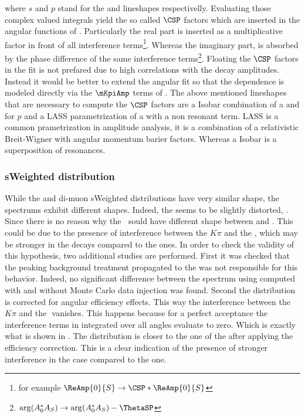 \noindent where $s$ and $p$ stand for the \swave and \pwave lineshapes respectivelly. Evaluating those complex valued integrals yield 
the so called $\CSP$ factors which are inserted in the angular functions of . Particularly the real part is inserted
as a multiplicative factor in front of all \spwave interference
terms\footnote{for example $\ReAmp{0}{S} \rightarrow \CSP * \ReAmp{0}{S} $}.
Whereas the imaginary part, is absorbed by the phase difference of the same interference 
terms\footnote{ $\arg(A_0^*A_S) \rightarrow \arg(A_0^*A_S) - \ThetaSP$}. Floating the $\CSP$ factors in the fit is not prefared due
to high correlations with the decay amplitudes. Instead it would be better to extend the angular fit so that the \mkpi dependence 
is modeled directly via the $\mKpiAmp$ terms of . The above mentioned lineshapes that are necessary
to compute the $\CSP$ factors are a Isobar combination of a \KstENT and \KstOFOZ for $p$ and a LASS parametrization of a \KstOFTZ
with a non resonant term. LASS is a common \swave prametrization in amplitude analysis, it is a combination of a relativistic Breit-Wigner
with angular momentum barier factors. Whereas a Isobar is a superposition of resonances.


\subsubsection{sWeighted \mkpi distribution}
While the \Bs and \Bd di-muon sWeighted distributions have very similar shape, the \mkpi spectrums exhibit different shapes. 
Indeed, the \Bs \mkpi \sPlot seems to be slightly distorted, . Since there is no reason why the \Kst$~$\pwave 
sould have different shape between \BsJpsiKst and \BdJpsiKst. This could be due to the presence of interference between
the $K\pi$ \swave and the \Kstarz, which may be stronger in the \Bs decays compared to the \Bd ones. In order 
to check the validity of this hypothesis, two additional studies are performed. First it was checked that the peaking
background treatment propagated to the \sWeights was not responsible for this behavior. Indeed, no significant difference 
between the \Bs \mkpi spectrum using \sWeights computed with and without Monte Carlo data injection was found. Second the \mkpi 
distribution is corrected for angular efficiency effects. This way the interference between the $K\pi$ \swave and the 
\Kstarz $ $ \pwave vanishes. This happens because for a perfect acceptance the interference terms in  integrated over all angles
evaluate to zero. Which is exactly what is shown in . The \Bs \mkpi distribution is closer to the one of the \Bd after applying
the efficiency correction. This is a clear indication of the presence of stronger interference in the \Bs case compared to the \Bd one.

